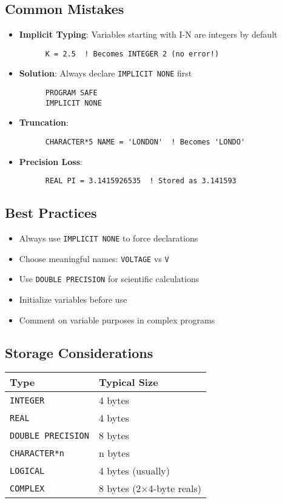 \documentclass{book}
\begin{document}
\subsection*{Common Mistakes}
\begin{itemize}
    \item \textbf{Implicit Typing}: Variables starting with I-N are integers by default
    \begin{verbatim}
      K = 2.5  ! Becomes INTEGER 2 (no error!)
    \end{verbatim}
    
    \item \textbf{Solution}: Always declare \texttt{IMPLICIT NONE} first
    \begin{verbatim}
      PROGRAM SAFE
      IMPLICIT NONE
      \end{verbatim}
    
    \item \textbf{Truncation}:
    \begin{verbatim}
      CHARACTER*5 NAME = 'LONDON'  ! Becomes 'LONDO'
    \end{verbatim}
    
    \item \textbf{Precision Loss}:
    \begin{verbatim}
      REAL PI = 3.1415926535  ! Stored as 3.141593
    \end{verbatim}
\end{itemize}

\subsection*{Best Practices}
\begin{itemize}
    \item Always use \texttt{IMPLICIT NONE} to force declarations
    \item Choose meaningful names: \texttt{VOLTAGE} vs \texttt{V}
    \item Use \texttt{DOUBLE PRECISION} for scientific calculations
    \item Initialize variables before use
    \item Comment on variable purposes in complex programs
\end{itemize}

\subsection*{Storage Considerations}
\begin{center}
\begin{tabular}{|l|l|}
\hline
\textbf{Type} & \textbf{Typical Size} \\ 
\hline
\texttt{INTEGER} & 4 bytes \\
\texttt{REAL} & 4 bytes \\
\texttt{DOUBLE PRECISION} & 8 bytes \\
\texttt{CHARACTER*n} & n bytes \\
\texttt{LOGICAL} & 4 bytes (usually) \\
\texttt{COMPLEX} & 8 bytes (2×4-byte reals) \\
\hline
\end{tabular}
\end{center}
\end{document}
